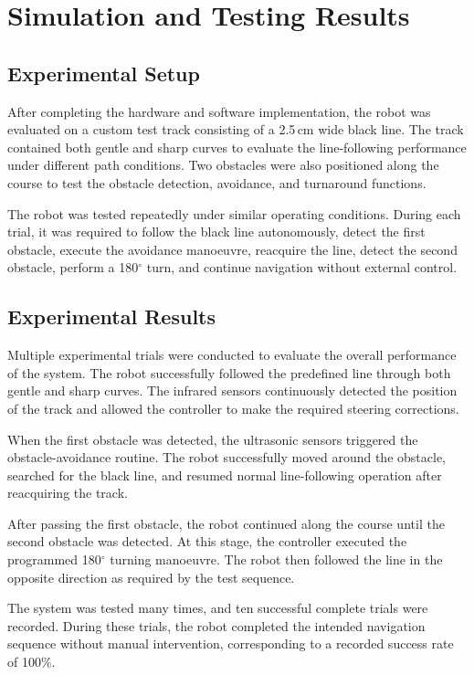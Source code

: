 \section{Simulation and Testing Results}
\label{sec:simulation_testing_results}

\subsection{Experimental Setup}

After completing the hardware and software implementation, the robot was evaluated on a custom test track consisting of a 2.5\,cm wide black line. The track contained both gentle and sharp curves to evaluate the line-following performance under different path conditions. Two obstacles were also positioned along the course to test the obstacle detection, avoidance, and turnaround functions.

The robot was tested repeatedly under similar operating conditions. During each trial, it was required to follow the black line autonomously, detect the first obstacle, execute the avoidance manoeuvre, reacquire the line, detect the second obstacle, perform a 180$^\circ$ turn, and continue navigation without external control.

\subsection{Experimental Results}

Multiple experimental trials were conducted to evaluate the overall performance of the system. The robot successfully followed the predefined line through both gentle and sharp curves. The infrared sensors continuously detected the position of the track and allowed the controller to make the required steering corrections.

When the first obstacle was detected, the ultrasonic sensors triggered the obstacle-avoidance routine. The robot successfully moved around the obstacle, searched for the black line, and resumed normal line-following operation after reacquiring the track.

After passing the first obstacle, the robot continued along the course until the second obstacle was detected. At this stage, the controller executed the programmed 180$^\circ$ turning manoeuvre. The robot then followed the line in the opposite direction as required by the test sequence.

The system was tested many times, and ten successful complete trials were recorded. During these trials, the robot completed the intended navigation sequence without manual intervention, corresponding to a recorded success rate of 100\%.

